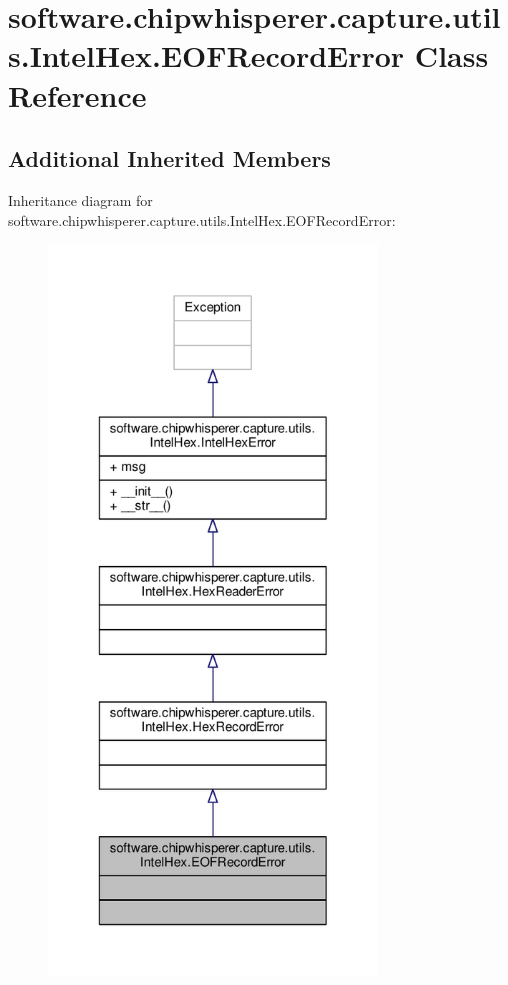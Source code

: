 \hypertarget{classsoftware_1_1chipwhisperer_1_1capture_1_1utils_1_1IntelHex_1_1EOFRecordError}{}\section{software.\+chipwhisperer.\+capture.\+utils.\+Intel\+Hex.\+E\+O\+F\+Record\+Error Class Reference}
\label{classsoftware_1_1chipwhisperer_1_1capture_1_1utils_1_1IntelHex_1_1EOFRecordError}
\subsection*{Additional Inherited Members}


Inheritance diagram for software.\+chipwhisperer.\+capture.\+utils.\+Intel\+Hex.\+E\+O\+F\+Record\+Error\+:\nopagebreak
\begin{figure}[H]
\begin{center}
\leavevmode
\includegraphics[height=550pt]{de/d32/classsoftware_1_1chipwhisperer_1_1capture_1_1utils_1_1IntelHex_1_1EOFRecordError__inherit__graph}
\end{center}
\end{figure}


